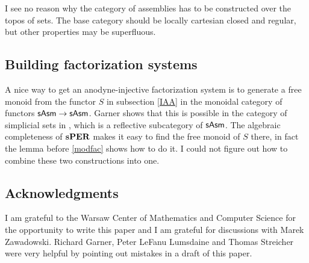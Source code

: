 \documentclass{amsart}
\theoremstyle{plain}
\theoremstyle{definition}
\begin{document}
I see no reason why the category of assemblies has to be constructed over the topos of sets. The base category should be locally cartesian closed and regular, but other properties may be superfluous.

\subsection{Building factorization systems}
A nice way to get an anodyne-injective factorization system is to generate a free monoid from the functor $S$ in subsection \ref{IAA} in the monoidal category of functors $\mathsf{sAsm} \to\mathsf{sAsm}$.  Garner shows that this is possible in the category of simplicial sets in \cite{MR2899720}, which is a reflective subcategory of $\mathsf{sAsm}$. The algebraic completeness of $\mathbf{s} \mathbf{PER}$ makes it easy to find the free monoid of $S$ there, in fact the lemma before \ref{modfac} shows how to do it. I could not figure out how to combine these two constructions into one.

\subsection*{Acknowledgments} 
I am grateful to the Warsaw Center of Mathematics and Computer Science for the opportunity to write this paper and I am grateful for discussions with Marek Zawadowski. Richard Garner, Peter LeFanu Lumsdaine and Thomas Streicher were very helpful by pointing out mistakes in a draft of this paper.



{}
\end{document}
